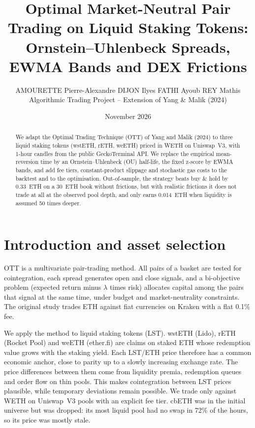\documentclass[10pt,a4paper]{article}
\title{Optimal Market-Neutral Pair Trading on Liquid Staking Tokens:\\
Ornstein--Uhlenbeck Spreads, EWMA Bands and DEX Frictions}
\author{AMOURETTE Pierre-Alexandre \quad DIJON Ilyes \quad FATHI Ayoub \quad REY Mathis\\[4pt]
\small Algorithmic Trading Project -- Extension of Yang \& Malik (2024)}
\date{November 2026}
\begin{document}
\maketitle
\vspace{-6mm}

\begin{abstract}
\noindent We adapt the Optimal Trading Technique (OTT) of Yang and Malik (2024) to three
liquid staking tokens (wstETH, rETH, weETH) priced in WETH on Uniswap~V3, with 1-hour
candles from the public GeckoTerminal API. We replace the empirical mean-reversion time
by an Ornstein--Uhlenbeck (OU) half-life, the fixed z-score by EWMA bands, and add fee
tiers, constant-product slippage and stochastic gas costs to the backtest and to the
optimisation. Out-of-sample, the strategy beats buy \& hold by 0.33~ETH on a 30~ETH book
without frictions, but with realistic frictions it does not trade at all at the observed
pool depth, and only earns 0.014~ETH when liquidity is assumed 50 times deeper.
\end{abstract}

\section{Introduction and asset selection}

OTT is a multivariate pair-trading method. All pairs of a basket are tested for
cointegration, each spread generates open and close signals, and a bi-objective problem
(expected return minus $\lambda$ times risk) allocates capital among the pairs that signal
at the same time, under budget and market-neutrality constraints. The original study
trades ETH against fiat currencies on Kraken with a flat 0.1\% fee.

We apply the method to liquid staking tokens (LST). wstETH (Lido), rETH (Rocket Pool)
and weETH (ether.fi) are claims on staked ETH whose redemption value grows with the
staking yield. Each LST/ETH price therefore has a common economic anchor, close to
parity up to a slowly increasing exchange rate. The price differences between them come
from liquidity premia, redemption queues and order flow on thin pools. This makes
cointegration between LST prices plausible, while temporary deviations remain possible.
We trade only against WETH on Uniswap~V3 pools with an explicit fee tier. cbETH was in
the initial universe but was dropped: its most liquid pool had no swap in 72\% of the
hours, so its price was mostly stale.
\end{document}
